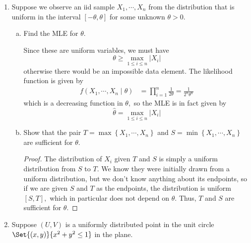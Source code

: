 \documentclass{article}
\begin{document}
\begin{enumerate}
\begin{enumerate}[(a)]
		\end{enumerate}

	\item Suppose we observe an iid sample $X_1, \cdots, X_n$ from the distribution that is uniform in the interval $[-\theta, \theta]$ for some unknown $\theta>0.$

		\begin{enumerate}[(a)]
			\item Find the MLE for $\theta.$
				\begin{soln}
					Since these are uniform variables, we must have \[\theta\ge \max_{1\le i\le n} \left\lvert X_i \right\rvert\] otherwise there would be an impossible data element. The likelihood function is given by 
					\begin{align*}
						f(X_1, \cdots, X_n\mid \theta) &= \prod_{i=1}^{n} \frac{1}{2\theta} = \frac{1}{2^n \theta^n}
					\end{align*} which is a decreasing function in $\theta,$ so the MLE is in fact given by \[\hat{\theta}=\max_{1\le i\le n} \left\lvert X_i \right\rvert\] 
				\end{soln}

			\item Show that the pair $T=\max\left\{ X_1, \cdots, X_n \right\}$ and $S=\min\left\{ X_1, \cdots, X_n \right\}$ are sufficient for $\theta.$
				\begin{proof}
					The distribution of $X_i$ given $T$ and $S$ is simply a uniform distribution from $S$ to $T.$ We know they were initially drawn from a uniform distribution, but we don't know anything about its endpoints, so if we are given $S$ and $T$ as the endpoints, the distribution is uniform $[S, T],$ which in particular does not depend on $\theta.$ Thus, $T$ and $S$ are sufficient for $\theta.$
					
				\end{proof}
				
		\end{enumerate}

	\item Suppose $(U, V)$ is a uniformly distributed point in the unit circle $\Set{(x, y)}{x^2+y^2\le 1}$ in the plane. 


\end{enumerate}
\end{document}
